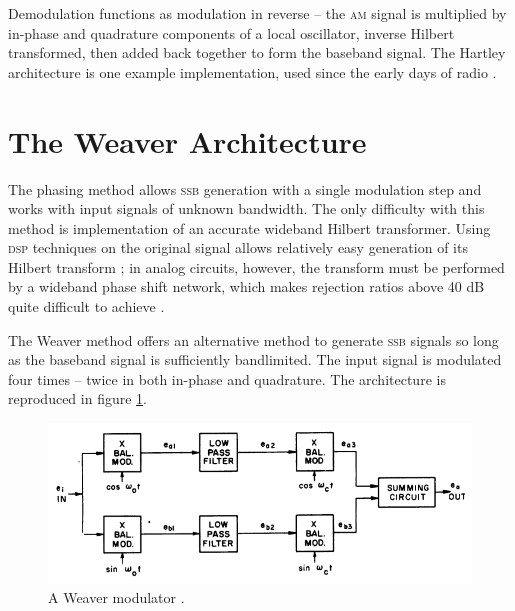 \documentclass[12pt]{article}
\newcommand{\rf}{\textsc{am}\xspace}
\newcommand{\ssb}{\textsc{ssb}\xspace}
\begin{document}
Demodulation functions as modulation in reverse -- the \rf signal is multiplied
by in-phase and quadrature components of a local oscillator, inverse Hilbert
transformed, then added back together to form the baseband signal. The Hartley
architecture is one example implementation, used since the early days of radio
\autocite{rf-microelectronics}.

\section{The Weaver Architecture}

The phasing method allows \ssb generation with a single modulation step and
works with input signals of unknown bandwidth. The only difficulty with this
method is implementation of an accurate wideband Hilbert transformer. Using
\textsc{dsp} techniques on the original signal allows relatively easy
generation of its Hilbert transform \autocite{ssb-tretter}; in analog circuits,
however, the transform must be performed by a wideband phase shift network,
which makes rejection ratios above 40 dB quite difficult to achieve
\autocite{weaver-himself}.

The Weaver method offers an alternative method to generate \ssb signals so long
as the baseband signal is sufficiently bandlimited. The input signal is
modulated four times -- twice in both in-phase and quadrature. The architecture
is reproduced in figure \ref{fig:weaver-from-paper}.

\begin{figure}[h]
	\centering
	\includegraphics[width=.9\textwidth]{weaver-from-paper.png}
	\caption{A Weaver modulator \autocite{weaver-himself}.}
	\label{fig:weaver-from-paper}
\end{figure}


\printbibliography
\end{document}
